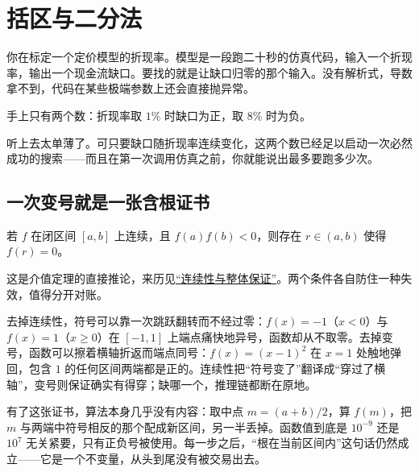 \section{括区与二分法}
\label{sec:08-Numerical-Analysis/02-Root-Finding/01}

你在标定一个定价模型的折现率。模型是一段跑二十秒的仿真代码，输入一个折现率，输出一个现金流缺口。要找的就是让缺口归零的那个输入。没有解析式，导数拿不到，代码在某些极端参数上还会直接抛异常。

手上只有两个数：折现率取 \(1\%\) 时缺口为正，取 \(8\%\) 时为负。

听上去太单薄了。可只要缺口随折现率连续变化，这两个数已经足以启动一次必然成功的搜索——而且在第一次调用仿真之前，你就能说出最多要跑多少次。

\subsection{一次变号就是一张含根证书}

\begin{proposition}
若 \(f\) 在闭区间 \([a,b]\) 上连续，且 \(f(a)f(b)<0\)，则存在 \(r\in(a,b)\) 使得 \(f(r)=0\)。
\end{proposition}

这是介值定理的直接推论，来历见\hyperref[sec:02-Calculus/02-Limits-and-Continuity/04]{``连续性与整体保证''}。两个条件各自防住一种失效，值得分开对账。

去掉连续性，符号可以靠一次跳跃翻转而不经过零：\(f(x)=-1\)（\(x<0\)）与 \(f(x)=1\)（\(x\ge 0\)）在 \([-1,1]\) 上端点痛快地异号，函数却从不取零。去掉变号，函数可以擦着横轴折返而端点同号：\(f(x)=(x-1)^2\) 在 \(x=1\) 处触地弹回，包含 \(1\) 的任何区间两端都是正的。连续性把``符号变了''翻译成``穿过了横轴''，变号则保证确实有得穿；缺哪一个，推理链都断在原地。

有了这张证书，算法本身几乎没有内容：取中点 \(m=(a+b)/2\)，算 \(f(m)\)，把 \(m\) 与两端中符号相反的那个配成新区间，另一半丢掉。函数值到底是 \(10^{-9}\) 还是 \(10^{7}\) 无关紧要，只有正负号被使用。每一步之后，``根在当前区间内''这句话仍然成立——它是一个不变量，从头到尾没有被交易出去。

